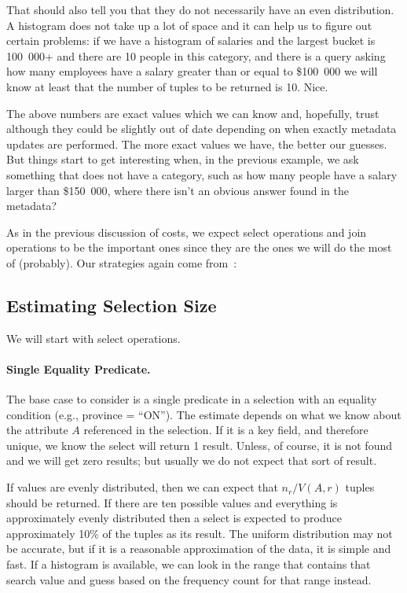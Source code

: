 That should also tell you that they do not necessarily have an even distribution. A histogram does not take up a lot of space and it can help us to figure out certain problems: if we have a histogram of salaries and the largest bucket is 100~000+ and there are 10 people in this category, and there is a query asking how many employees have a salary greater than or equal to \$100~000 we will know at least that the number of tuples to be returned is 10. Nice.

The above numbers are exact values which we can know and, hopefully, trust although they could be slightly out of date depending on when exactly metadata updates are performed. The more exact values we have, the better our guesses. But things start to get interesting when, in the previous example, we ask something that does not have a category, such as how many people have a salary larger than \$150~000, where there isn't an obvious answer found in the metadata?

As in the previous discussion of costs, we expect select operations and join operations to be the important ones since they are the ones we will do the most of (probably). Our strategies again come from~\cite{dsc}: 

\subsection*{Estimating Selection Size}

We will start with select operations.


\paragraph{Single Equality Predicate.} The base case to consider is a single predicate in a selection with an equality condition (e.g., province = ``ON''). The estimate depends on what we know about the attribute $A$ referenced in the selection. If it is a key field, and therefore unique, we know the select will return 1 result. Unless, of course, it is not found and we will get zero results; but usually we do not expect that sort of result. 

If values are evenly distributed, then we can expect that $n_{r}/V(A, r)$ tuples should be returned. If there are ten possible values and everything is approximately evenly distributed then a select is expected to produce approximately 10\% of the tuples as its result. The uniform distribution may not be accurate, but if it is a reasonable approximation of the data, it is simple and fast. If a histogram is available, we can look in the range that contains that search value and guess based on the frequency count for that range instead.

